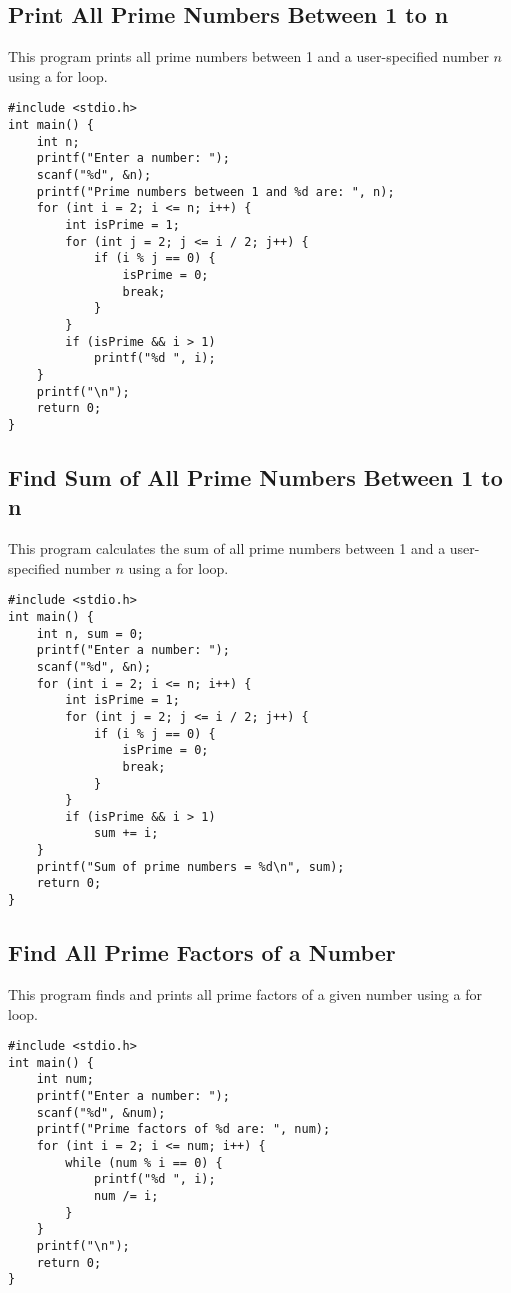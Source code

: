 \documentclass[a4paper,12pt]{article}
\begin{document}
\subsection{Print All Prime Numbers Between 1 to n}
This program prints all prime numbers between 1 and a user-specified number \(n\) using a for loop.

\begin{lstlisting}[caption={Print All Prime Numbers Between 1 to n}]
#include <stdio.h>
int main() {
    int n;
    printf("Enter a number: ");
    scanf("%d", &n);
    printf("Prime numbers between 1 and %d are: ", n);
    for (int i = 2; i <= n; i++) {
        int isPrime = 1;
        for (int j = 2; j <= i / 2; j++) {
            if (i % j == 0) {
                isPrime = 0;
                break;
            }
        }
        if (isPrime && i > 1)
            printf("%d ", i);
    }
    printf("\n");
    return 0;
}
\end{lstlisting}

\newpage

\subsection{Find Sum of All Prime Numbers Between 1 to n}
This program calculates the sum of all prime numbers between 1 and a user-specified number \(n\) using a for loop.

\begin{lstlisting}[caption={Find Sum of All Prime Numbers Between 1 to n}]
#include <stdio.h>
int main() {
    int n, sum = 0;
    printf("Enter a number: ");
    scanf("%d", &n);
    for (int i = 2; i <= n; i++) {
        int isPrime = 1;
        for (int j = 2; j <= i / 2; j++) {
            if (i % j == 0) {
                isPrime = 0;
                break;
            }
        }
        if (isPrime && i > 1)
            sum += i;
    }
    printf("Sum of prime numbers = %d\n", sum);
    return 0;
}
\end{lstlisting}

\newpage

\subsection{Find All Prime Factors of a Number}
This program finds and prints all prime factors of a given number using a for loop.

\begin{lstlisting}[caption={Find All Prime Factors of a Number}]
#include <stdio.h>
int main() {
    int num;
    printf("Enter a number: ");
    scanf("%d", &num);
    printf("Prime factors of %d are: ", num);
    for (int i = 2; i <= num; i++) {
        while (num % i == 0) {
            printf("%d ", i);
            num /= i;
        }
    }
    printf("\n");
    return 0;
}
\end{lstlisting}
\end{document}

